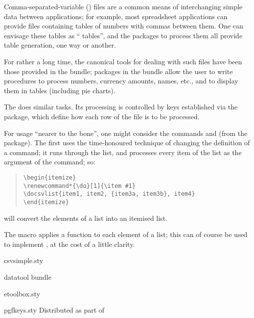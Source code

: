 
Comma-separated-variable () files are a common means of
interchanging simple data between applications; for example, most
spreadsheet applications can provide files containing tables of
numbers with commas between them.  One can envisage these tables as
``\latex{} tables'', and the packages to process them all provide
table generation, one way or another.

For rather a long time, the canonical tools for dealing with such
files have been those provided in the  bundle;
packages in the bundle allow the user to write procedures to process
numbers, currency amounts, names, etc., and to display them in tables
(including pie charts).

The  does similar tasks.  Its processing is
controlled by keys established via the  package,
which define how each row of the  file is to be processed.

For usage ``nearer to the bone'', one might consider the commands
 and  (from the 
package).  The first uses the time-honoured \latex{} technique of
changing the definition of a  command; it runs through the
list, and processes every item of the list as the argument of the
 command; so:
\begin{quote}
\begin{verbatim}
\begin{itemize}
\renewcommand*{\do}[1]{\item #1}
\docsvlist{item1, item2, {item3a, item3b}, item4}
\end{itemize}
\end{verbatim}
\end{quote}
will convert the elements of a  list into an itemised list.

The macro  applies a function to each element of a
 list; this can of course be used to implement
, at the cost of a little clarity.
\begin{ctanrefs}
\item[csvsimple.sty]
\item[datatool \nothtml{\rmfamily}bundle]
\item[etoolbox.sty]
\item[pgfkeys.sty]Distributed as part of 
\end{ctanrefs}
